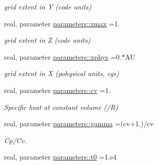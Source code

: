 \begin{DoxyCompactItemize}
\begin{DoxyCompactList}\small\item\em grid extent in Y (code units) \end{DoxyCompactList}\item 
\hypertarget{namespaceparameters_a1c9cf29115f4fd4cf4820e25de385fe8}{}real, parameter \hyperlink{namespaceparameters_a1c9cf29115f4fd4cf4820e25de385fe8}{parameters\+::zmax} =1.\label{namespaceparameters_a1c9cf29115f4fd4cf4820e25de385fe8}

\begin{DoxyCompactList}\small\item\em grid extent in Z (code units) \end{DoxyCompactList}\item 
\hypertarget{namespaceparameters_ae3e749942c74fc165950811be811fbbf}{}real, parameter \hyperlink{namespaceparameters_ae3e749942c74fc165950811be811fbbf}{parameters\+::xphys} =0.$\ast$A\+U\label{namespaceparameters_ae3e749942c74fc165950811be811fbbf}

\begin{DoxyCompactList}\small\item\em grid extent in X (pohysical units, cgs) \end{DoxyCompactList}\item 
\hypertarget{namespaceparameters_a755803b69c4c41eab3f29d49aab07080}{}real, parameter \hyperlink{namespaceparameters_a755803b69c4c41eab3f29d49aab07080}{parameters\+::cv} =1.\label{namespaceparameters_a755803b69c4c41eab3f29d49aab07080}

\begin{DoxyCompactList}\small\item\em Specific heat at constant volume (/\+R) \end{DoxyCompactList}\item 
\hypertarget{namespaceparameters_a106ef8f4b97ef7fba8e7845c774c31fd}{}real, parameter \hyperlink{namespaceparameters_a106ef8f4b97ef7fba8e7845c774c31fd}{parameters\+::gamma} =(cv+1.)/cv\label{namespaceparameters_a106ef8f4b97ef7fba8e7845c774c31fd}

\begin{DoxyCompactList}\small\item\em Cp/\+Cv. \end{DoxyCompactList}\item 
\hypertarget{namespaceparameters_a9b9fbce5a8439155ee7ae1ac23feef54}{}real, parameter \hyperlink{namespaceparameters_a9b9fbce5a8439155ee7ae1ac23feef54}{parameters\+::t0} =1.e4\label{namespaceparameters_a9b9fbce5a8439155ee7ae1ac23feef54}


\end{DoxyCompactItemize}
